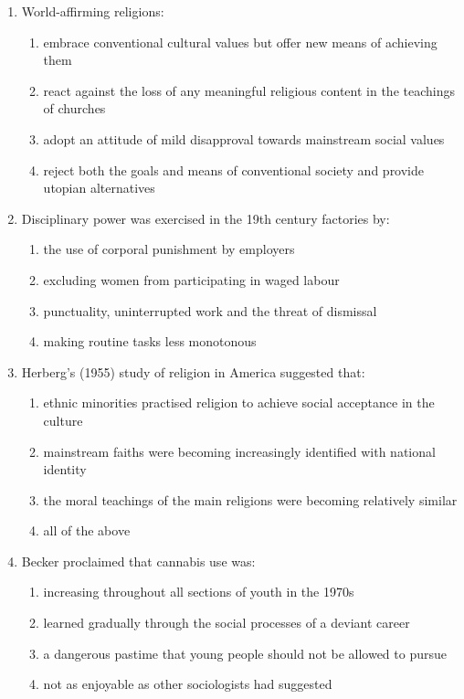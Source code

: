 \documentclass[12pt]{article}
\begin{document}
\begin{enumerate}[label=\arabic*.]
\begin{enumerate}[label=(\alph*)]
    \item charismatic authority
    \item rational-legal authority
    \item traditional authority
    \item value-rational authority
\end{enumerate}
\item World-affirming religions:
\begin{enumerate}[label=(\alph*)]
    \item embrace conventional cultural values but offer new means of achieving them
    \item react against the loss of any meaningful religious content in the teachings of churches
    \item adopt an attitude of mild disapproval towards mainstream social values
    \item reject both the goals and means of conventional society and provide utopian alternatives
\end{enumerate}
\item Disciplinary power was exercised in the 19th century factories by:
\begin{enumerate}[label=(\alph*)]
    \item the use of corporal punishment by employers
    \item excluding women from participating in waged labour
    \item punctuality, uninterrupted work and the threat of dismissal
    \item making routine tasks less monotonous
\end{enumerate}
\item Herberg's (1955) study of religion in America suggested that:
\begin{enumerate}[label=(\alph*)]
    \item ethnic minorities practised religion to achieve social acceptance in the culture
    \item mainstream faiths were becoming increasingly identified with national identity
    \item the moral teachings of the main religions were becoming relatively similar
    \item all of the above
\end{enumerate}
\item Becker proclaimed that cannabis use was:
\begin{enumerate}[label=(\alph*)]
    \item increasing throughout all sections of youth in the 1970s
    \item learned gradually through the social processes of a deviant career
    \item a dangerous pastime that young people should not be allowed to pursue
    \item not as enjoyable as other sociologists had suggested
\end{enumerate}
\end{enumerate}
\end{document}
